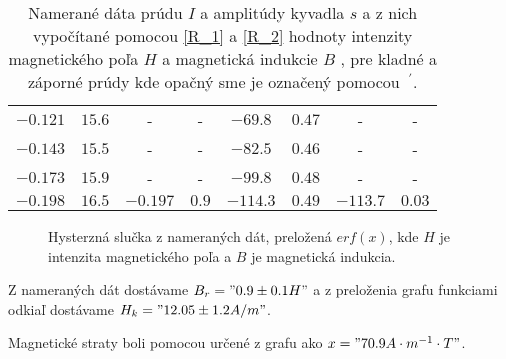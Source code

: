 \begin{table}[h]
\begin{center}
\begin{tabular}{| c | c | c | c | c | c | c | c |}
$-0.121 $&$ 15.6  $& -        &  -     &$ -69.8 $&$ 0.47  $&  -      & -     \\
$-0.143 $&$ 15.5  $& -        &  -     &$ -82.5 $&$ 0.46  $&  -      & -     \\
$-0.173 $&$ 15.9  $& -        &  -     &$ -99.8 $&$ 0.48  $&  -      & -     \\
$-0.198 $&$ 16.5  $&$ -0.197 $&$ 0.9  $&$-114.3 $&$ 0.49  $&$ -113.7$&$ 0.03$\\
\hline
\end{tabular}
\caption{Namerané dáta prúdu $I$ a amplitúdy kyvadla $s$ a 
z nich vypočítané pomocou \ref{R_1} a \ref{R_2} hodnoty intenzity magnetického poľa $H$ a 
magnetická indukcie $B$ , pre kladné a záporné prúdy
kde opačný sme je označený pomocou $~^\prime$. 
} \label{T_1}
\end{center}
\end{table}


\begin{figure}

\caption{Hysterzná slučka z nameraných dát, preložená $erf(x)$, 
kde $H$ je intenzita magnetického poľa a $B$ je magnetická indukcia. 
}  \label{G_1}
\end{figure}

Z nameraných dát dostávame $B_r="0.9\pm0.1 H"$ a z preloženia grafu funkciami 
odkiaľ dostávame $H_k=" 12.05\pm1.2 A/m"$.

Magnetické straty boli pomocou určené z grafu ako $x = "70.9 A\cdot m^{-1}\cdot T"$.




